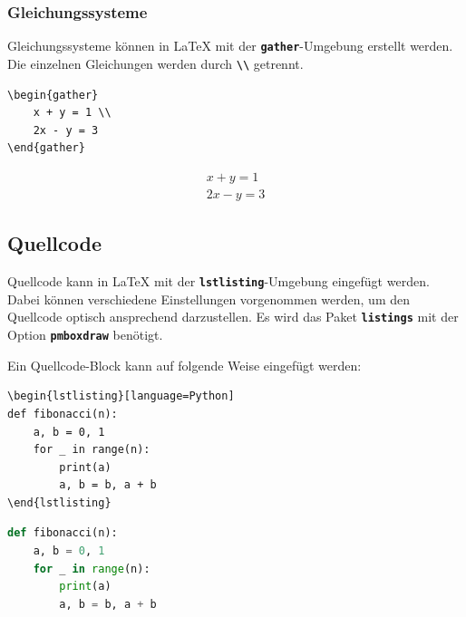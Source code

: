 \subsubsection{Gleichungssysteme}
Gleichungssysteme können in \LaTeX{} mit der \textbf{\texttt{gather}}-Umgebung erstellt werden. Die einzelnen Gleichungen werden durch \textbf{\texttt{\textbackslash\textbackslash}} getrennt.

\begin{minipage}{0.5\textwidth}
    \begin{lstlisting}[language={[LaTeX]TeX}]
\begin{gather}
    x + y = 1 \\
    2x - y = 3
\end{gather}
\end{lstlisting}
\end{minipage}
\hfill
\begin{minipage}{0.5\textwidth}
    \begin{gather}
        x + y = 1 \\
        2x - y = 3
    \end{gather}
\end{minipage}

\subsection{Quellcode}
Quellcode kann in \LaTeX{} mit der \textbf{\texttt{lstlisting}}-Umgebung eingefügt werden. Dabei können verschiedene Einstellungen vorgenommen werden, um den Quellcode optisch ansprechend darzustellen. Es wird das Paket \textbf{\texttt{listings}} mit der Option \textbf{\texttt{pmboxdraw}} benötigt.

Ein Quellcode-Block kann auf folgende Weise eingefügt werden:

\begin{minipage}{0.48\textwidth}
    \begin{verbatim}
\begin{lstlisting}[language=Python]
def fibonacci(n):
    a, b = 0, 1
    for _ in range(n):
        print(a)
        a, b = b, a + b
\end{lstlisting}
\end{verbatim}
\end{minipage}
\hfill
\begin{minipage}{0.48\textwidth}
    \begin{lstlisting}[language=Python]
def fibonacci(n):
    a, b = 0, 1
    for _ in range(n):
        print(a)
        a, b = b, a + b
    \end{lstlisting}
\end{minipage}

